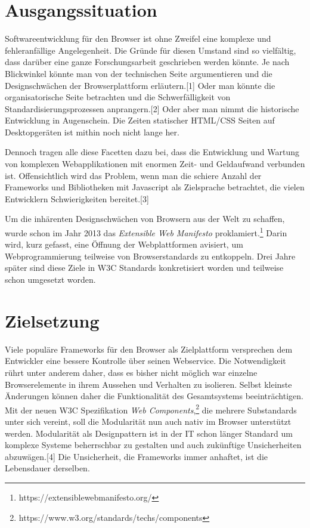 \section{Ausgangssituation}\label{ausgangssituation}

Softwareentwicklung für den Browser ist ohne Zweifel eine komplexe und
fehleranfällige Angelegenheit. Die Gründe für diesen Umstand sind so
vielfältig, dass darüber eine ganze Forschungsarbeit geschrieben werden
könnte. Je nach Blickwinkel könnte man von der technischen Seite
argumentieren und die Designschwächen der Browserplattform
erläutern.{[}1{]} Oder man könnte die organisatorische Seite betrachten
und die Schwerfälligkeit von Standardisierungsprozessen
anprangern.{[}2{]} Oder aber man nimmt die historische Entwicklung in
Augenschein. Die Zeiten statischer HTML/CSS Seiten auf Desktopgeräten
ist mithin noch nicht lange her.

Dennoch tragen alle diese Facetten dazu bei, dass die Entwicklung und
Wartung von komplexen Webapplikationen mit enormen Zeit- und Geldaufwand
verbunden ist. Offensichtlich wird das Problem, wenn man die schiere
Anzahl der Frameworks und Bibliotheken mit Javascript als Zielsprache
betrachtet, die vielen Entwicklern Schwierigkeiten bereitet.{[}3{]}

Um die inhärenten Designschwächen von Browsern aus der Welt zu schaffen,
wurde schon im Jahr 2013 das \emph{Extensible Web Manifesto}
proklamiert.\footnote{https://extensiblewebmanifesto.org/} Darin wird,
kurz gefasst, eine Öffnung der Webplattformen avisiert, um
Webprogrammierung teilweise von Browserstandards zu entkoppeln. Drei
Jahre später sind diese Ziele in W3C Standards konkretisiert worden und
teilweise schon umgesetzt worden.

\section{Zielsetzung}\label{zielsetzung}

Viele populäre Frameworks für den Browser als Zielplattform versprechen
dem Entwickler eine bessere Kontrolle über seinen Webservice. Die
Notwendigkeit rührt unter anderem daher, dass es bisher nicht möglich
war einzelne Browserelemente in ihrem Aussehen und Verhalten zu
isolieren. Selbst kleinste Änderungen können daher die Funktionalität
des Gesamtsystems beeinträchtigen. Mit der neuen W3C Spezifikation
\emph{Web Components},\footnote{https://www.w3.org/standards/techs/components}
die mehrere Substandards unter sich vereint, soll die Modularität nun
auch nativ im Browser unterstützt werden. Modularität als Designpattern
ist in der IT schon länger Standard um komplexe Systeme beherrschbar zu
gestalten und auch zukünftige Unsicherheiten abzuwägen.{[}4{]} Die
Unsicherheit, die Frameworks immer anhaftet, ist die Lebensdauer
derselben.

